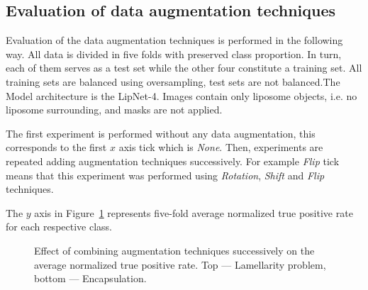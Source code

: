 \documentclass[a4paper, 11pt, table]{article}
\begin{document}
 

\subsection{Evaluation of data augmentation techniques}

Evaluation of the data augmentation techniques is performed in the following way. All data is divided in five folds with preserved class proportion. In turn, each of them serves as a test set while the other four constitute a training set. All training sets are balanced using oversampling, test sets are not balanced.The  Model architecture is the LipNet-4. Images contain only liposome objects, i.e. no liposome surrounding, and masks are not applied.

The first experiment is performed without any data augmentation, this corresponds to the first $x$ axis tick which is \textit{None}. Then, experiments are repeated adding augmentation techniques successively. For example \textit{Flip} tick means that this experiment was performed using \textit{Rotation}, \textit{Shift} and \textit{Flip} techniques.

The $y$ axis in Figure~\ref{fig:augmentation_evaluation} represents five-fold average normalized true positive rate for each respective class. 

\begin{figure}[H]
\centering


\caption{\label{fig:augmentation_evaluation}Effect of combining augmentation techniques successively on the average normalized true positive rate. Top --- Lamellarity problem, bottom --- Encapsulation.}
\end{figure}
\end{document}
